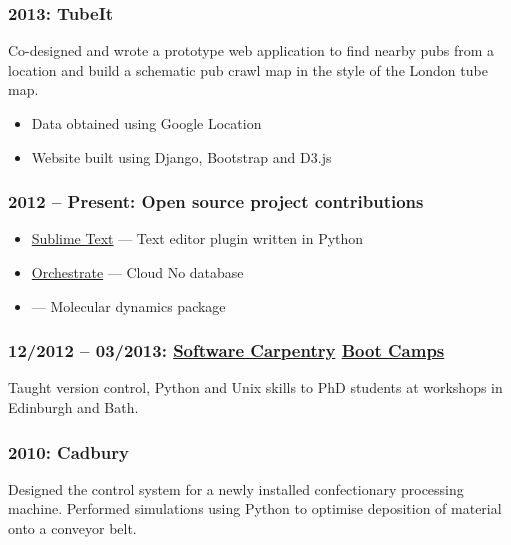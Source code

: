\documentclass[10pt]{article}
\begin{document}
        \subsubsection{2013: TubeIt}
            Co-designed and wrote a prototype web application to find nearby pubs from a location and build a schematic pub crawl map in the style of the London tube map.

            \begin{itemize}
                \item{Data obtained using Google Location }
                \item{Website built using Django, Bootstrap and D3.js}
            \end{itemize}

        \subsubsection{2012 -- Present: Open source project contributions}

            \begin{itemize}
                \item{\href{http://github.com/eddiejessup/transcrypt}{Sublime Text} --- Text editor plugin written in Python}
                \item{\href{http://github.com/orchestrate-io/porc}{Orchestrate} --- Cloud No database}
                \item{\href{http://lammps.sandia.gov}{} --- Molecular dynamics package}
            \end{itemize}

        \subsubsection{12/2012 -- 03/2013: \href{http://software-carpentry.org}{Software Carpentry} \href{http://software-carpentry.org/workshops}{Boot Camps}}

            Taught version control, Python and Unix skills to PhD students at workshops in Edinburgh and Bath.

        \subsubsection{2010: Cadbury}

            Designed the control system for a newly installed confectionary processing machine. Performed simulations using Python to optimise deposition of material onto a conveyor belt.
\end{document}
